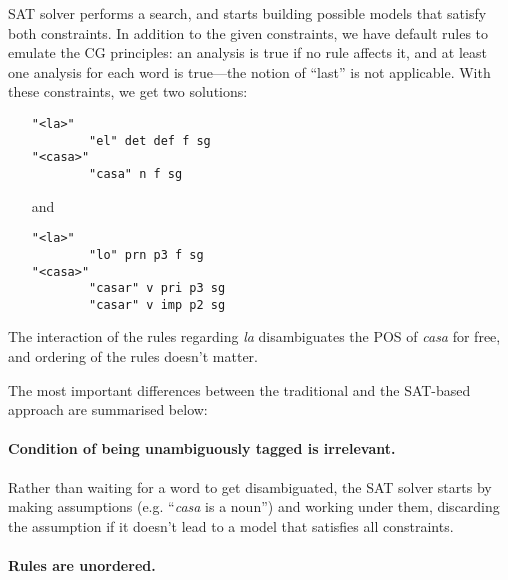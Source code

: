 \documentclass[11pt]{article}
\begin{document}
SAT solver performs a search, 
and starts building possible models that satisfy both constraints. 
In addition to the given constraints, we have default rules to emulate
the CG principles: an analysis is true if no rule affects it,
and at least one analysis for each word is true---the notion of ``last'' is not applicable.
With these constraints, we get two solutions: 
\begin{enumerate}
\item []
\begin{verbatim}
"<la>"
        "el" det def f sg
"<casa>"
        "casa" n f sg
\end{verbatim}
\item [and]
\begin{verbatim}
"<la>"
        "lo" prn p3 f sg
"<casa>"
        "casar" v pri p3 sg
        "casar" v imp p2 sg
\end{verbatim}
\end{enumerate} 
The interaction of the rules regarding \emph{la}  disambiguates the POS of \emph{casa} 
for free, and ordering of the rules doesn't matter. 


The most important differences between the traditional and the SAT-based approach are summarised below:

\paragraph{Condition of being unambiguously tagged is irrelevant.}
Rather than waiting for a word to get disambiguated, the SAT solver starts by 
making assumptions (e.g. ``\emph{casa} is a noun'') and working under them,
discarding the assumption if it doesn't lead to a model that satisfies all constraints.

\paragraph{Rules are unordered.}
\end{document}
